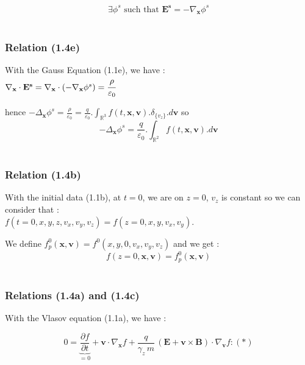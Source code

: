 \documentclass[10pt]{article}
\newcommand{\D}{{\partial}}
\begin{document}
$$\boxed{\exists \phi^{s} \text{ such that } \mathbf{E^s} = - \nabla_{\mathbf{x}}\phi^{s}}$$ \\


\subsubsection{Relation (1.4e)}


With the Gauss Equation (1.1e), we have : \\
$\nabla_{\mathbf{x}} \cdot \mathbf{E^s} = \nabla_{\mathbf{x}} \cdot \left( - \nabla_{\mathbf{x}}\phi^{s} \right) = \cfrac{\rho}{\varepsilon_{0}}$

hence $- \Delta_{\mathbf{x}} \phi^{s} = \frac{\rho}{\varepsilon_{0}} = \frac{q}{\varepsilon_{0}}.\int_{\mathbb{R}^3} f(t,\mathbf{x},\mathbf{v}).\delta_{\{v_z\}}.d\mathbf{v}$ so \\
$$\boxed{- \Delta_{\mathbf{x}} \phi^{s} = \frac{q}{\varepsilon_{0}}.\int_{\mathbb{R}^2} f(t,\mathbf{x},\mathbf{v}).d\mathbf{v}} $$ \\


\subsubsection{Relation (1.4b)}


With the initial data (1.1b), at $t = 0$, we are on $z = 0$, $v_z$ is constant so we can consider that : \\
$f(t=0,x,y,z,v_x,v_y,v_z) = f(z=0,x,y,v_x,v_y)$.

We define $f_p^0(\mathbf{x},\mathbf{v}) = f^0(x,y,0,v_x,v_y,v_z)$ and we get : \\
$$\boxed{f(z=0,\mathbf{x},\mathbf{v}) = f_p^0(\mathbf{x},\mathbf{v})}$$ \\



\subsubsection{Relations (1.4a) and (1.4c)}


With the Vlasov equation (1.1a), we have :

$$ 0 = \underbrace{\frac{\D f}{\D t}}_{=0} + \mathbf{v} \cdot \nabla_{\mathbf{x}}f + \frac{q}{\gamma_{z}\,m}\,(\mathbf{E}+\mathbf{v}\times\mathbf{B}) \cdot \nabla_{\mathbf{v}}f : (*)$$
\end{document}
